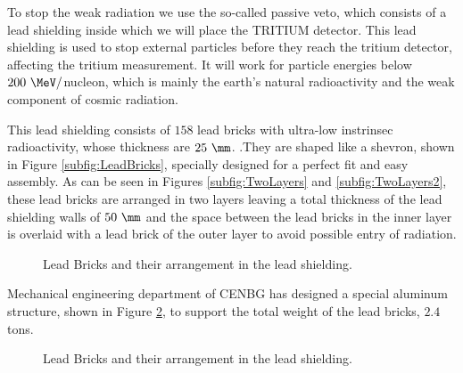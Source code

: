 To stop the weak radiation we use the so-called passive veto, which consists of a lead shielding inside which we will place the TRITIUM detector. This lead shielding is used to stop external particles before they reach the tritium detector, affecting the tritium measurement. It will work for particle energies below $200~\MeV/$nucleon, which is mainly the earth's natural radioactivity and the weak component of cosmic radiation.

This lead shielding consists of $158$ lead bricks with ultra-low instrinsec radioactivity, whose thickness are $25~\mm$. .They are shaped like a shevron, shown in Figure \ref{subfig:LeadBricks}, specially designed for a perfect fit and easy assembly. As can be seen in Figures \ref{subfig:TwoLayers} and \ref{subfig:TwoLayers2}, these lead bricks are arranged in two layers leaving a total thickness of the lead shielding walls of $50~\mm$ and the space between the lead bricks in the inner layer is overlaid with a lead brick of the outer layer to avoid possible entry of radiation.

\begin{figure}[htbp]
 \centering
 \caption{Lead Bricks and their arrangement in the lead shielding.}
 \label{fig:LeadBricksAndArrangement}
\end{figure}

Mechanical engineering department of CENBG has designed a special aluminum structure, shown in Figure \ref{fig:AluminiumStructure}, to support the total weight of the lead bricks, $2.4$ tons.

\begin{figure}[htbp]
 \centering
    \caption{Lead Bricks and their arrangement in the lead shielding.}
 \label{fig:AluminiumStructure}
\end{figure}

